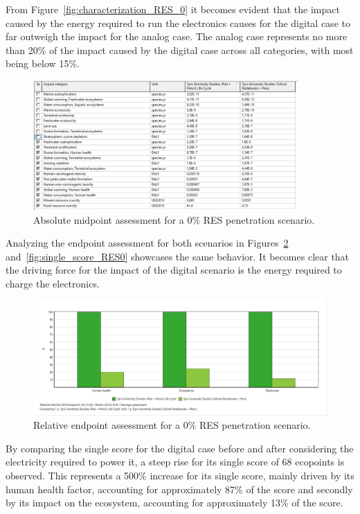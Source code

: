 From Figure~\ref{fig:characterization_RES_0} it becomes evident that the impact caused by the energy required to run the electronics causes for the digital case to far outweigh the impact for the analog case. The analog case represents no more than 20\% of the impact caused by the digital case across all categories, with most being below 15\%.

\begin{figure}[H]
    \centering
    \includegraphics[width=0.9\textwidth]{images/RES_0/Characterization_Table_RES_0.PNG}
    \caption{Absolute midpoint assessment for a 0\% RES penetration scenario.}\label{fig:characterization_table_RES_0}
\end{figure}

Analyzing the endpoint assessment for both scenarios in Figures~\ref{fig:damage_assessment_RES_0} and~\ref{fig:single_score_RES0} showcases the same behavior. It becomes clear that the driving force for the impact of the digital scenario is the energy required to charge the electronics.

\begin{figure}[H]
    \centering
    \includegraphics[width=\textwidth]{images/RES_0/Damage_Assessment_RES_0.JPG}
    \caption{Relative endpoint assessment for a 0\% RES penetration scenario.}\label{fig:damage_assessment_RES_0}
\end{figure}

By comparing the single score for the digital case before and after considering the electricity required to power it, a steep rise for its single score of 68 ecopoints is observed. This represents a 500\% increase for its single score, mainly driven by its human health factor, accounting for approximately 87\% of the score and secondly by its impact on the ecosystem, accounting for approximately 13\% of the score. 

